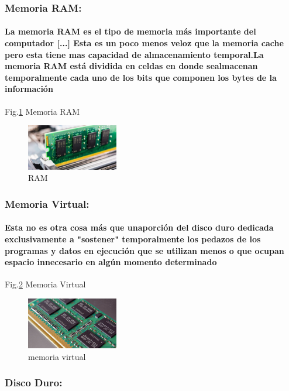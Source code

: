 \documentclass{article}
\begin{document}
\subsubsection{Memoria RAM:}

\paragraph{La memoria RAM es el tipo de memoria más importante del computador [...] Esta es un poco menos veloz que la memoria cache pero esta tiene mas capacidad de almacenamiento temporal.La memoria RAM está dividida en celdas en donde sealmacenan temporalmente cada uno de los bits que componen los bytes de la información \cite{taller}}

Fig.\ref{fig:RAM} Memoria RAM
    \begin{figure}[h]
    \includegraphics[width=4cm]{RAM.jpg}
    \centering
    \caption{RAM}
    \label{fig:RAM}
    \end{figure}
\subsubsection{Memoria Virtual:}

\paragraph{Esta no es otra cosa más que unaporción del disco duro dedicada exclusivamente a "sostener" temporalmente los pedazos de los
programas y datos en ejecución que se utilizan menos o que ocupan espacio innecesario en
algún momento determinado\cite{taller} }

Fig.\ref{fig:memoria virtual} Memoria Virtual
    \begin{figure}[h]
    \includegraphics[width=4cm]{memoria virtual.jpg}
    \centering
    \caption{memoria virtual}
    \label{fig:memoria virtual}
    \end{figure}
    
\subsubsection{Disco Duro:}
\end{document}
